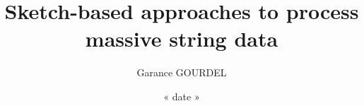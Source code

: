 





\author{Garance GOURDEL}

\title{Sketch-based approaches to process massive string data}
\date{« date »}



